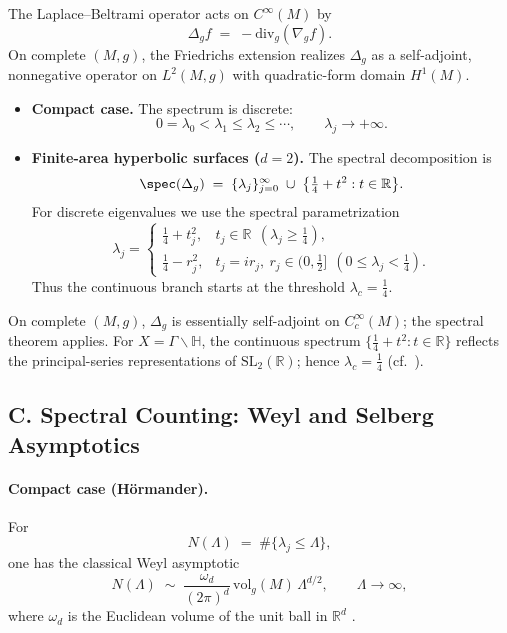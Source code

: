 The Laplace--Beltrami operator acts on $C^\infty(M)$ by
\[
   \Delta_g f \;=\; -\mathrm{div}_g(\nabla_g f).
\]
On complete $(M,g)$, the Friedrichs extension realizes $\Delta_g$ as a self-adjoint,
nonnegative operator on $L^2(M,g)$ with quadratic-form domain $H^1(M)$.

\begin{itemize}

  \item \textbf{Compact case.} The spectrum is discrete:
  \[
    0=\lambda_0 < \lambda_1 \le \lambda_2 \le \cdots,\qquad \lambda_j\to+\infty.
  \]

  \item \textbf{Finite-area hyperbolic surfaces ($d=2$).}
  The spectral decomposition is
  \[
    \spec(\Delta_g)
    \;=\;
    \{\lambda_j\}_{j=0}^\infty
    \;\cup\;
    \big\{\tfrac14 + t^2 : t\in\mathbb{R}\big\}.
  \]
  For discrete eigenvalues we use the spectral parametrization
  \[
    \lambda_j=
    \begin{cases}
      \tfrac14 + t_j^2, & t_j\in\mathbb{R} \ \ (\lambda_j\ge\tfrac14),\\[4pt]
      \tfrac14 - r_j^2, & t_j=i r_j,\ r_j\in(0,\tfrac12] \ \ (0\le\lambda_j<\tfrac14).
    \end{cases}
  \]
  Thus the continuous branch starts at the threshold $\lambda_c=\tfrac14$.

\end{itemize}

\begin{remark}[Essential self-adjointness and the threshold \texorpdfstring{$\lambda_c=\tfrac14$}{lambda\_c=1/4}]
On complete $(M,g)$, $\Delta_g$ is essentially self-adjoint on $C_c^\infty(M)$; the spectral theorem applies.
For $X=\Gamma\backslash\mathbb{H}$, the continuous spectrum $\{\tfrac14+t^2:t\in\mathbb{R}\}$ reflects the principal-series representations of $\mathrm{SL}_2(\mathbb{R})$; hence $\lambda_c=\tfrac14$ (cf.\ \cite{LaxPhillips1976,Hejhal1983II}).
\end{remark}


\subsection*{C. Spectral Counting: Weyl and Selberg Asymptotics}
\label{subsec:weyl}

\paragraph{Compact case (Hörmander).}
For
\[
   N(\Lambda) \;=\; \#\{\lambda_j \le \Lambda\},
\]
one has the classical Weyl asymptotic
\[
   N(\Lambda) \;\sim\; \frac{\omega_d}{(2\pi)^d}\,\mathrm{vol}_g(M)\,\Lambda^{d/2},
   \qquad \Lambda\to\infty,
\]
where $\omega_d$ is the Euclidean volume of the unit ball in $\mathbb{R}^d$ \cite{Hormander1968}.

